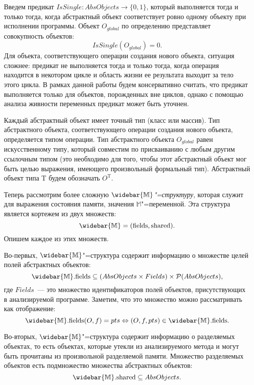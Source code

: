 \documentclass[14pt,titlepage,draft]{extarticle}
\newcommand{\M}{\ensuremath{\mathbb{M}}}
\newcommand{\Ms}{\ensuremath{\mathbb{\widebar{M}}}}
\newcommand{\Mf}[1]{\ensuremath{\mathrm{#1}}}
\newcommand{\type}[1]{\mathrm{#1}}
\newcommand{\AOTyped}[1]{O^{\type{#1}}}
\newcommand{\AO}{O}
\newcommand{\AOGlobal}{\AO_{global}}
\begin{document}
    Введем предикат $IsSingle\colon AbsObjects \to \{0, 1\}$, который
    выполняется тогда и только тогда, когда абстрактный объект соответствует
    ровно одному объекту при исполнении программы. Объект $\AOGlobal$ по
    определению представляет совокупность объектов:
    \[ IsSingle(\AOGlobal) = 0. \]
    Для объекта, соответствующего операции создания нового объекта, ситуация
    сложнее: предикат не выполняется тогда и только тогда, когда операция
    находится в некотором цикле и область жизни ее результата выходит за тело
    этого цикла. В рамках данной работы будем консервативно считать, что
    предикат выполняется только для объектов, порожденных вне циклов, однако с
    помощью анализа живности переменных предикат может быть уточнен.

    Каждый абстрактный объект имеет точный тип (класс или массив). Тип
    абстрактного объекта, соответствующего операции создания нового объекта,
    определяется типом операции. Тип абстрактного объекта $\AOGlobal$ равен
    искусственному типу, который совместим по присваиванию с любым другим
    ссылочным типом (это необходимо для того, чтобы этот абстрактный объект мог
    быть целью выражения, имеющего произвольный формальный тип). Абстрактный
    объект типа $\type{T}$ будем обозначать $\AOTyped{T}$.

    Теперь рассмотрим более сложную \emph{\Ms"=структуру}, которая служит для
    выражения состояния памяти, значения \M"=переменной.
    Эта структура является кортежем из двух множеств:
    \[ \Ms = (\Mf{fields}, \Mf{shared}). \]
    Опишем каждое из этих множеств.

    Во-первых, \Ms"=структура содержит информацию о множестве целей полей
    абстрактных объектов:
    \[
      \Ms.\Mf{fields} \subseteq
        (AbsObjects \times Fields) \times
        \powerset{AbsObjects},
    \]
    где $Fields$~--- это множество идентификаторов полей объектов,
    присутствующих в анализируемой программе.
    Заметим, что это множество можно рассматривать как отображение:
    \[
      \Ms.\Mf{fields}(O, f) = pts \Leftrightarrow
        (O, f, pts) \in \Ms.\Mf{fields}.
    \]

    Во-вторых, \Ms"=структура содержит информацию о разделяемых объектах,
    то есть объектах, которые утекли  из анализируемого метода
    и могут быть прочитаны из произвольной разделяемой памяти. Множество
    разделяемых объектов есть подмножество множества абстрактных объектов:
    \[ \Ms.\Mf{shared} \subseteq AbsObjects. \]
\end{document}
